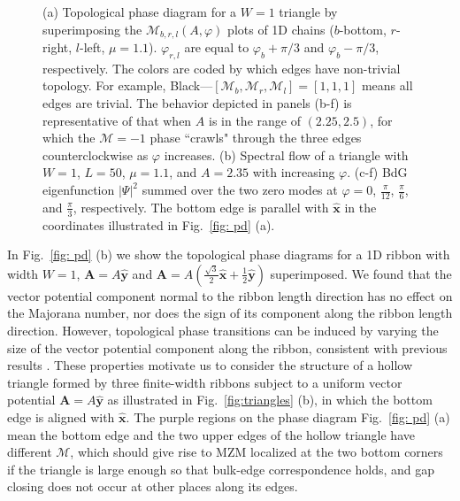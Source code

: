 \documentclass[aps,prb,twocolumn,showpacs,amsmath,amssymb,superscriptaddress]{revtex4-2}
\let\oldhat\hat
\renewcommand{\hat}[1]{\oldhat{\mathbf{#1}}}
\begin{document}
\begin{figure}[ht]
  \caption{(a) Topological phase diagram for a $W=1$ triangle by superimposing the $\mathcal{M}_{b,r,l}(A,\varphi)$ plots of 1D chains ($b$-bottom, $r$-right, $l$-left, $\mu=1.1$). $\varphi_{r,l}$ are equal to $\varphi_b+\pi/3$ and $\varphi_b-\pi/3$, respectively. The colors are coded by which edges have non-trivial topology. For example, Black---$[\mathcal{M}_b, \mathcal{M}_r, \mathcal{M}_l]=[1,1,1]$ means all edges are trivial. The behavior depicted in panels (b-f) is representative of that when $A$ is in the range of $(2.25,2.5)$, for which the $\mathcal{M}=-1$ phase ``crawls" through the three edges counterclockwise as $\varphi$ increases. (b) Spectral flow of a triangle with $W=1$, $L=50$, $\mu=1.1$, and $A=2.35$ with increasing $\varphi$. (c-f) BdG eigenfunction $|\Psi|^2$ summed over the two zero modes at $\varphi = 0$, $\frac{\pi}{12}$, $\frac{\pi}{6}$, and $\frac{\pi}{3}$, respectively. The bottom edge is parallel with $\hat{x}$ in the coordinates illustrated in Fig.~\ref{fig: pd} (a).}
  \label{fig: rotation}
\end{figure}

In Fig.~\ref{fig: pd} (b) we show the topological phase diagrams for a 1D ribbon with width $W=1$, $\mathbf A = A\hat{y}$ and $\mathbf A = A(\frac{\sqrt{3}}{2}\hat{x}+\frac{1}{2}\hat{y})$ superimposed. We found that the vector potential component normal to the ribbon length direction has no effect on the Majorana number, nor does the sign of its component along the ribbon length direction. However, topological phase transitions can be induced by varying the size of the vector potential component along the ribbon, consistent with previous results \cite{romitoManipulatingMajoranaFermions2012, takasanSupercurrentinducedTopologicalPhase2022}. These properties motivate us to consider the structure of a hollow triangle formed by three finite-width ribbons subject to a uniform vector potential $\mathbf A = A\hat{y}$ as illustrated in Fig.~\ref{fig:triangles} (b), in which the bottom edge is aligned with $\hat{x}$. The purple regions on the phase diagram Fig.~\ref{fig: pd} (a) mean the bottom edge and the two upper edges of the hollow triangle have different $\mathcal{M}$, which should give rise to MZM localized at the two bottom corners if the triangle is large enough so that bulk-edge correspondence holds, and gap closing does not occur at other places along its edges.
\end{document}
